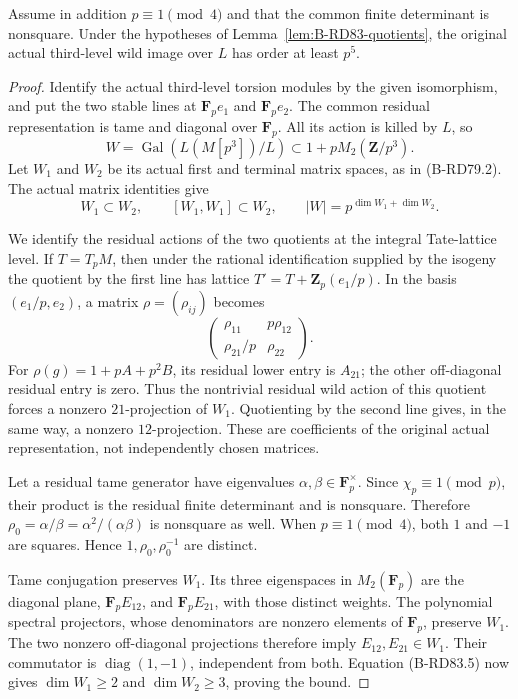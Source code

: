 \begin{proposition}
\label{prop:B-RD83-Lie}
Assume in addition \(p\equiv1\pmod4\) and that the common
finite determinant is nonsquare. Under the hypotheses of
Lemma~\ref{lem:B-RD83-quotients}, the original actual
third-level wild image over \(L\) has order at least \(p^5\).
\end{proposition}
\begin{proof}
Identify the actual third-level torsion modules by the given
isomorphism, and put the two stable lines at
\(\mathbf F_pe_1\) and \(\mathbf F_pe_2\). The common
residual representation is tame and diagonal over
\(\mathbf F_p\). All its action is killed by \(L\), so
\[
 W=\operatorname{Gal}(L(M[p^3])/L)
        \subset1+pM_2(\mathbf Z/p^3).
\]
Let \(W_1\) and \(W_2\) be its actual first and terminal
matrix spaces, as in (B-RD79.2). The actual matrix identities
give
\[
 W_1\subset W_2,\qquad [W_1,W_1]\subset W_2,
       \qquad |W|=p^{\dim W_1+\dim W_2}.              \tag{B-RD83.5}
\]

We identify the residual actions of the two quotients at
the integral Tate-lattice level. If \(T=T_pM\), then under
the rational identification supplied by the isogeny the
quotient by the first line has lattice
\(T'=T+\mathbf Z_p(e_1/p)\). In the basis
\((e_1/p,e_2)\), a matrix \(\rho=(\rho_{ij})\) becomes
\[
                \begin{pmatrix}
                 \rho_{11}&p\rho_{12}\\
                 \rho_{21}/p&\rho_{22}
                \end{pmatrix}.                       \tag{B-RD83.6}
\]
For \(\rho(g)=1+pA+p^2B\), its residual lower entry is
\(A_{21}\); the other off-diagonal residual entry is zero.
Thus the nontrivial residual wild action of this quotient
forces a nonzero \(21\)-projection of \(W_1\). Quotienting
by the second line gives, in the same way, a nonzero
\(12\)-projection. These are coefficients of the original
actual representation, not independently chosen matrices.

Let a residual tame generator have eigenvalues
\(\alpha,\beta\in\mathbf F_p^\times\). Since
\(\chi_p\equiv1\pmod p\), their product is the residual
finite determinant and is nonsquare. Therefore
\(\rho_0=\alpha/\beta=\alpha^2/(\alpha\beta)\) is
nonsquare as well. When \(p\equiv1\pmod4\), both
\(1\) and \(-1\) are squares. Hence
\(1,\rho_0,\rho_0^{-1}\) are distinct.

Tame conjugation preserves \(W_1\). Its three eigenspaces
in \(M_2(\mathbf F_p)\) are the diagonal plane,
\(\mathbf F_pE_{12}\), and \(\mathbf F_pE_{21}\), with
those distinct weights. The polynomial spectral projectors,
whose denominators are nonzero elements of \(\mathbf F_p\),
preserve \(W_1\). The two nonzero off-diagonal projections
therefore imply \(E_{12},E_{21}\in W_1\). Their commutator
is \(\operatorname{diag}(1,-1)\), independent from both.
Equation (B-RD83.5) now gives
\(\dim W_1\ge2\) and \(\dim W_2\ge3\), proving the bound.
\end{proof}

